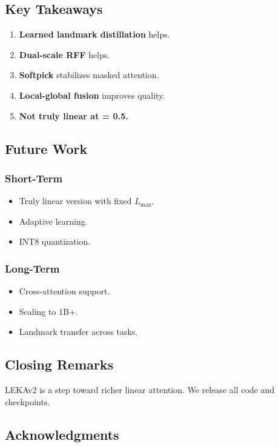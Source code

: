 \subsection{Key Takeaways}

\begin{enumerate}
\item \textbf{Learned landmark distillation} helps.
\item \textbf{Dual-scale RFF} helps.
\item \textbf{Softpick} stabilizes masked attention.
\item \textbf{Local-global fusion} improves quality.
\item \textbf{Not truly linear at   = 0.5.}

\end{enumerate}
\subsection{Future Work}

\subsubsection{Short-Term}
\begin{itemize}
\item Truly linear version with fixed $L_\text{max}$.
\item Adaptive   learning.
\item INT8 quantization.

\end{itemize}
\subsubsection{Long-Term}
\begin{itemize}
\item Cross-attention support.
\item Scaling to 1B+.
\item Landmark transfer across tasks.

\end{itemize}
\subsection{Closing Remarks}

LEKAv2 is a step toward richer linear attention. We release all code and 
checkpoints.

\subsection{Acknowledgments}

